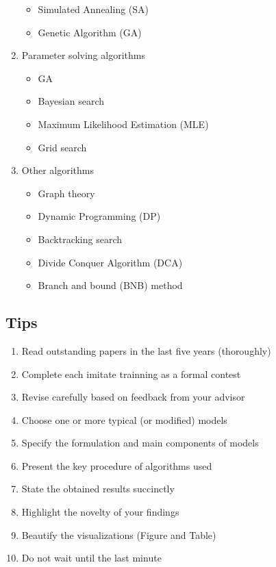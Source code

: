 \documentclass[12pt]{article}  %
\begin{document}
\begin{enumerate}[(1)]
\begin{itemize}
     \item Simulated Annealing (SA)
     \item Genetic Algorithm (GA)
 \end{itemize}
 \item Parameter solving algorithms
 \begin{itemize}
     \setlength{\parsep}{0ex} %
     \setlength{\topsep}{2ex} %
     \setlength{\itemsep}{1ex} %
     \item GA
     \item Bayesian search
     \item Maximum Likelihood Estimation (MLE)
     \item Grid search
 \end{itemize}
 \item Other algorithms
 \begin{itemize}
     \setlength{\parsep}{0ex} %
     \setlength{\topsep}{2ex} %
     \setlength{\itemsep}{1ex} %
     \item Graph theory
     \item Dynamic Programming (DP)
     \item Backtracking search
     \item Divide Conquer Algorithm (DCA)
     \item Branch and bound (BNB) method
 \end{itemize}
 \end{enumerate}
 
 \subsection{Tips}
  
 \begin{enumerate}[(1)]
     \item Read outstanding papers in the last five years (thoroughly)
     \item Complete each imitate trainning as a formal contest
     \item Revise carefully based on feedback from your advisor
     \item Choose one or more typical (or modified) models  
     \item Specify the formulation and main components of models
     \item Present the key procedure of algorithms used
     \item State the obtained results succinctly
     \item Highlight the novelty of your findings
     \item Beautify the visualizations (Figure and Table)
     \item Do not wait until the last minute
 \end{enumerate} 
 
\end{document}

